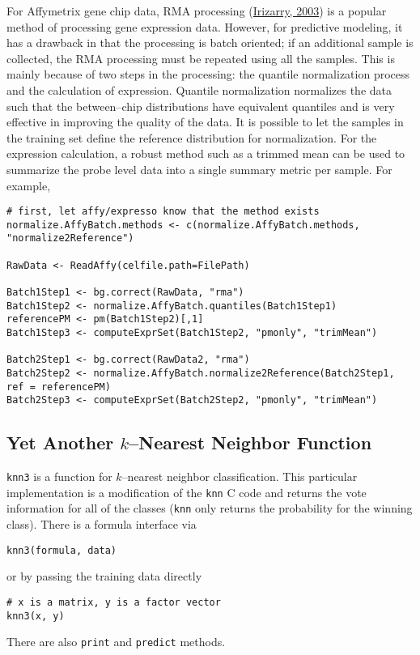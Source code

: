 \documentclass[12pt]{article}
\begin{document}
For Affymetrix gene chip data, RMA processing (\href{http://nar.oxfordjournals.org/cgi/content/abstract/31/4/e15}{Irizarry, 2003}) is a popular method of processing gene expression data. However, for predictive modeling, it has a drawback in that the processing is batch oriented; if an additional sample is collected, the RMA processing must be repeated using all the samples. This is mainly because of two steps in the processing: the quantile normalization process and the calculation of expression. Quantile normalization normalizes the data such that the between--chip distributions have equivalent quantiles and is very effective in improving the quality of the data. It is possible to let the samples in the training set define the reference distribution for normalization. For the expression calculation, a robust method such as a trimmed mean can be used to summarize the probe level data into a single summary metric per sample. For example,
\begin{Verbatim}
# first, let affy/expresso know that the method exists
normalize.AffyBatch.methods <- c(normalize.AffyBatch.methods, "normalize2Reference")
   
RawData <- ReadAffy(celfile.path=FilePath)
   
Batch1Step1 <- bg.correct(RawData, "rma")
Batch1Step2 <- normalize.AffyBatch.quantiles(Batch1Step1)
referencePM <- pm(Batch1Step2)[,1]
Batch1Step3 <- computeExprSet(Batch1Step2, "pmonly", "trimMean")  
   
Batch2Step1 <- bg.correct(RawData2, "rma")
Batch2Step2 <- normalize.AffyBatch.normalize2Reference(Batch2Step1, ref = referencePM)
Batch2Step3 <- computeExprSet(Batch2Step2, "pmonly", "trimMean")     
\end{Verbatim}


\subsection{Yet Another $k$--Nearest Neighbor Function}

\texttt{knn3} is a function for $k$--nearest neighbor classification. This particular implementation is a modification of the \texttt{knn} C code and returns the vote information for all of the classes (\texttt{knn} only returns the probability for the winning class). There is a formula interface via
\begin{Verbatim}
knn3(formula, data)
\end{Verbatim}
or by passing the training data directly
\begin{Verbatim}
# x is a matrix, y is a factor vector
knn3(x, y)
\end{Verbatim}
There are also \texttt{print} and \texttt{predict} methods.
\end{document}
